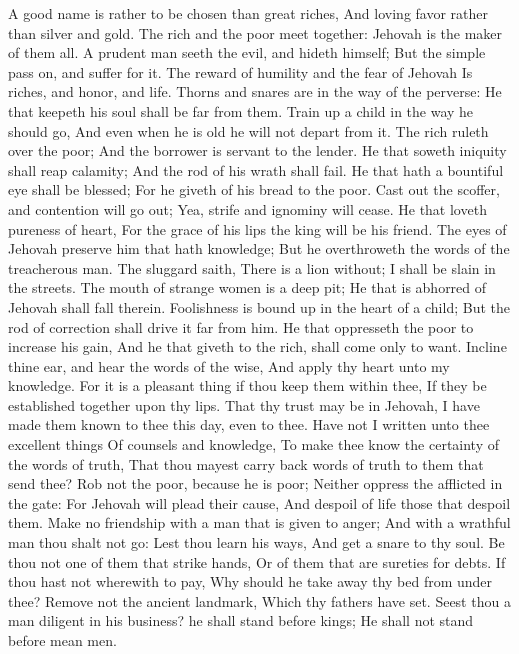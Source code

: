 A good name is rather to be chosen than great riches, And loving favor rather than silver and gold.  The rich and the poor meet together: Jehovah is the maker of them all.  A prudent man seeth the evil, and hideth himself; But the simple pass on, and suffer for it.  The reward of humility and the fear of Jehovah Is riches, and honor, and life.  Thorns and snares are in the way of the perverse: He that keepeth his soul shall be far from them.  Train up a child in the way he should go, And even when he is old he will not depart from it.  The rich ruleth over the poor; And the borrower is servant to the lender.  He that soweth iniquity shall reap calamity; And the rod of his wrath shall fail.  He that hath a bountiful eye shall be blessed; For he giveth of his bread to the poor.  Cast out the scoffer, and contention will go out; Yea, strife and ignominy will cease.  He that loveth pureness of heart, For the grace of his lips the king will be his friend.  The eyes of Jehovah preserve him that hath knowledge; But he overthroweth the words of the treacherous man.  The sluggard saith, There is a lion without; I shall be slain in the streets.  The mouth of strange women is a deep pit; He that is abhorred of Jehovah shall fall therein.  Foolishness is bound up in the heart of a child; But the rod of correction shall drive it far from him.  He that oppresseth the poor to increase his gain, And he that giveth to the rich, shall come only to want.  Incline thine ear, and hear the words of the wise, And apply thy heart unto my knowledge.  For it is a pleasant thing if thou keep them within thee, If they be established together upon thy lips.  That thy trust may be in Jehovah, I have made them known to thee this day, even to thee.  Have not I written unto thee excellent things Of counsels and knowledge,  To make thee know the certainty of the words of truth, That thou mayest carry back words of truth to them that send thee?  Rob not the poor, because he is poor; Neither oppress the afflicted in the gate:  For Jehovah will plead their cause, And despoil of life those that despoil them.  Make no friendship with a man that is given to anger; And with a wrathful man thou shalt not go:  Lest thou learn his ways, And get a snare to thy soul.  Be thou not one of them that strike hands, Or of them that are sureties for debts.  If thou hast not wherewith to pay, Why should he take away thy bed from under thee?  Remove not the ancient landmark, Which thy fathers have set.  Seest thou a man diligent in his business? he shall stand before kings; He shall not stand before mean men. 

